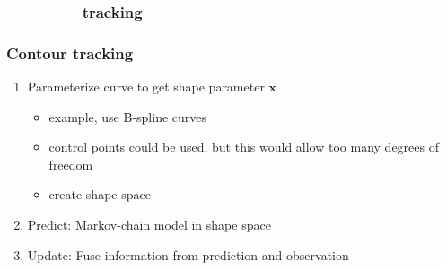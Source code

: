 

\subsubsection{\ \ \ \ \ \ \ \ \   tracking}
\begin{frame}
\frametitle{Contour tracking}
\logoCSIPCPL\mypagenum
	\begin{enumerate}
		\item Parameterize curve to get shape parameter $\mathbf{x}$
			\begin{itemize}
				\item example, use B-spline curves
				\item control points could be used, but this would allow too many degrees of freedom
				\item create shape space
			\end{itemize}
		\item Predict: Markov-chain model in shape space
		\item Update: Fuse information from prediction and observation
	\end{enumerate}
\end{frame}


%	




